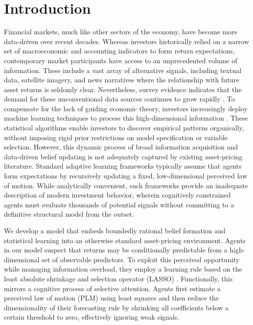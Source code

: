 \section{Introduction}

Financial markets, much like other sectors of the economy, have become more data-driven over recent decades.
Whereas investors historically relied on a narrow set of macroeconomic and accounting indicators to form return expectations, contemporary market participants have access to an unprecedented volume of information.
These include a vast array of alternative signals, including textual data, satellite imagery, and news narratives where the relationship with future asset returns is seldomly clear.
Nevertheless, survey evidence indicates that the demand for these unconventional data sources continues to grow rapidly \citep{lowenstein_sandler_2026}.
To compensate for the lack of guiding economic theory, investors increasingly deploy machine learning techniques to process this high-dimensional information \citep{cfa_invesco_2024}.
These statistical algorithms enable investors to discover empirical patterns organically, without imposing rigid prior restrictions on model specification or variable selection.
However, this dynamic process of broad information acquisition and data-driven belief updating is not adequately captured by existing asset-pricing literature.
Standard adaptive learning frameworks typically assume that agents form expectations by recursively updating a fixed, low-dimensional perceived law of motion.
While analytically convenient, such frameworks provide an inadequate description of modern investment behavior, wherein cognitively constrained agents must evaluate thousands of potential signals without committing to a definitive structural model from the outset.

We develop a model that embeds boundedly rational belief formation and statistical learning into an otherwise standard asset-pricing environment.
Agents in our model suspect that returns may be conditionally predictable from a high-dimensional set of observable predictors.
To exploit this perceived opportunity while managing information overload, they employ a learning rule based on the least absolute shrinkage and selection operator (LASSO) \citep{Tibshirani1996}.
Functionally, this mirrors a cognitive process of selective attention.
Agents first estimate a perceived law of motion (PLM) using least squares and then reduce the dimensionality of their forecasting rule by shrinking all coefficients below a certain threshold to zero, effectively ignoring weak signals.

